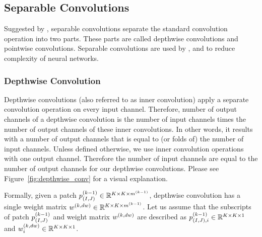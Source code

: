 \subsection{Separable Convolutions}
Suggested by \cite{sifre2014rigid}, separable convolutions separate the standard convolution operation into two parts. These parts are called depthwise convolutions and pointwise convolutions. Separable convolutions are used by \cite{chollet2016xception}, \cite{howard2017mobilenets} and \cite{howard2017mobilenets} to reduce complexity of neural networks.
\subsubsection{Depthwise Convolution}
Depthwise convolutions (also referred to as inner convolution) apply a separate convolution operation  on every input channel. Therefore, number of output channels of a depthwise convolution is the number of input channels times the number of output channels of these inner convolutions. In other words, it results with a number of output channels that is equal to (or folds of) the number of input channels. Unless defined otherwise, we use inner convolution operations with one output channel. Therefore the number of input channels are equal to the number of output channels for our depthwise convolutions. Please see Figure~\ref{fig:depthwise_conv} for a visual explanation.

Formally, given a patch $ p^{(k-1)}_{(I,J)} \in \mathbb{R}^{K \times K \times m^{(k-1)}}$, depthwise convolution has a single weight matrix $w^{(k, dw)} \in \mathbb{R}^{K \times K \times m^{(k-1)}}$. Let us assume that the subscripts of patch $p^{(k-1)}_{(I,J)}$ and weight matrix $w^{(k, dw)}$ are described as $p^{(k-1)}_{(I,J),i} \in \mathbb{R}^{K \times K \times 1}$ and $w^{(k, dw)}_{i} \in \mathbb{R}^{K \times K \times 1}$.

